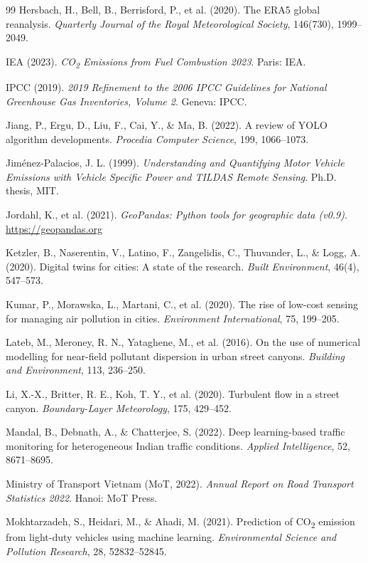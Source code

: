 \documentclass[12pt,a4paper]{article}
\begin{document}
\begin{thebibliography}{99}
Hersbach, H., Bell, B., Berrisford, P., et al. (2020). The ERA5 global reanalysis. \textit{Quarterly Journal of the Royal Meteorological Society}, 146(730), 1999--2049.

IEA (2023). \textit{CO\textsubscript{2} Emissions from Fuel Combustion 2023}. Paris: IEA.

IPCC (2019). \textit{2019 Refinement to the 2006 IPCC Guidelines for National Greenhouse Gas Inventories, Volume 2}. Geneva: IPCC.

Jiang, P., Ergu, D., Liu, F., Cai, Y., \& Ma, B. (2022). A review of YOLO algorithm developments. \textit{Procedia Computer Science}, 199, 1066--1073.

Jiménez-Palacios, J. L. (1999). \textit{Understanding and Quantifying Motor Vehicle Emissions with Vehicle Specific Power and TILDAS Remote Sensing}. Ph.D. thesis, MIT.

Jordahl, K., et al. (2021). \textit{GeoPandas: Python tools for geographic data (v0.9)}. \url{https://geopandas.org}

Ketzler, B., Naserentin, V., Latino, F., Zangelidis, C., Thuvander, L., \& Logg, A. (2020). Digital twins for cities: A state of the research. \textit{Built Environment}, 46(4), 547--573.

Kumar, P., Morawska, L., Martani, C., et al. (2020). The rise of low-cost sensing for managing air pollution in cities. \textit{Environment International}, 75, 199--205.

Lateb, M., Meroney, R. N., Yataghene, M., et al. (2016). On the use of numerical modelling for near-field pollutant dispersion in urban street canyons. \textit{Building and Environment}, 113, 236--250.

Li, X.-X., Britter, R. E., Koh, T. Y., et al. (2020). Turbulent flow in a street canyon. \textit{Boundary-Layer Meteorology}, 175, 429--452.

Mandal, B., Debnath, A., \& Chatterjee, S. (2022). Deep learning-based traffic monitoring for heterogeneous Indian traffic conditions. \textit{Applied Intelligence}, 52, 8671--8695.

Ministry of Transport Vietnam (MoT, 2022). \textit{Annual Report on Road Transport Statistics 2022}. Hanoi: MoT Press.

Mokhtarzadeh, S., Heidari, M., \& Ahadi, M. (2021). Prediction of CO\textsubscript{2} emission from light-duty vehicles using machine learning. \textit{Environmental Science and Pollution Research}, 28, 52832--52845.


\end{thebibliography}
\end{document}
